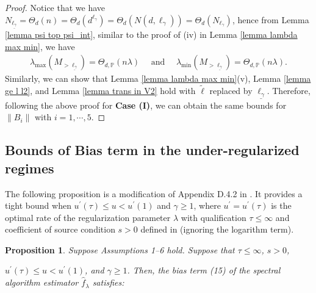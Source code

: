 \documentclass{article}
\theoremstyle{plain}
\newtheorem{proposition}[theorem]{Proposition}
\theoremstyle{definition}
\theoremstyle{remark}
\begin{document}
\begin{appendix}
\begin{proof}
Notice that we have ${N}_{\underline{\ell_{\gamma}}} = \Theta_d(n)=\Theta_d(d^{\ell_{\gamma}}) = \Theta_d(N(d, \ell_{\gamma})) = \Theta_d(N_{\ell_{\gamma}})$, hence from Lemma \ref{lemma psi top psi_int}, similar to the proof of (iv) in Lemma \ref{lemma lambda max min}, we have
\begin{align*}
        \lambda_{\text{max}}(M_{>\underline{\ell_{\gamma}}}) 
        = \Theta_{d, \mathbb{P}}(n\lambda)
        \quad \text{ and } \quad
        \lambda_{\text{min}}(M_{>\underline{\ell_{\gamma}}}) = \Theta_{d, \mathbb{P}}(n\lambda).
    \end{align*}
Similarly, we can show that Lemma \ref{lemma lambda max min}(v), Lemma \ref{lemma ge l l2}, and Lemma \ref{lemma trans in V2} hold with $\tilde{\ell}$ replaced by $\underline{\ell_{\gamma}}$. Therefore, following the above proof for {\bf Case (I)}, we can obtain the same bounds for $\|B_i\|$ with $i=1, \cdots, 5$.
\end{proof}





\subsection{Bounds of Bias term in the under-regularized regimes}

The following proposition is a modification of Appendix D.4.2 in \cite{lu2024saturation}. It provides a tight bound when $u^{\prime}(\tau) \leq u < u^{\prime}(1)$ and $\gamma \geq 1$, where $u^{\prime} = u^{\prime}(\tau)$ is the optimal rate of the regularization parameter $\lambda$ with qualification $\tau \leq \infty$ and coefficient of source condition $s>0$ defined in \cite{lu2024saturation} (ignoring the logarithm term).


\begin{proposition}\label{prop_verify_bias_special}
    Suppose Assumptions 1--6 hold.
Suppose that $\tau \leq \infty$, $s>0$,

$u^{\prime}(\tau) \leq u < u^{\prime}(1)$, and $\gamma \geq 1$. 
Then, the bias term (15) of the spectral algorithm estimator $\hat{f}_{\lambda}$ satisfies:


\end{proposition}
\end{appendix}
\end{document}
